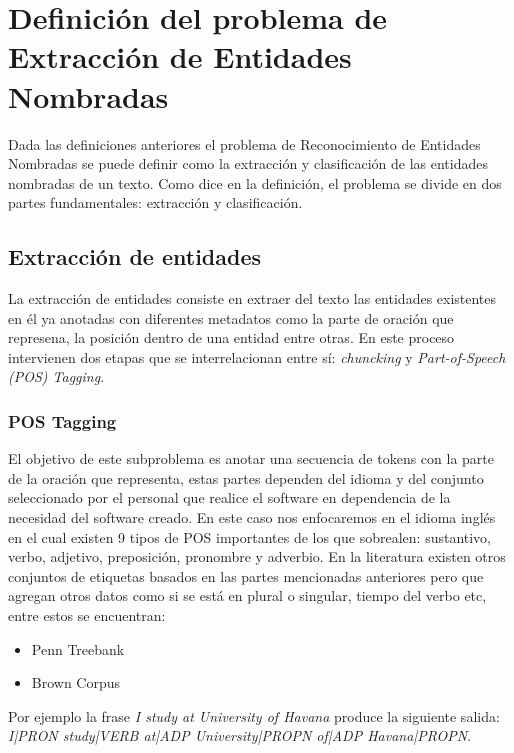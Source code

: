 \documentclass[runningheads]{llncs}
\begin{document}
\section{Definición del problema de Extracción de Entidades Nombradas}

Dada las definiciones anteriores el problema de Reconocimiento de Entidades Nombradas se puede definir como la extracción y clasificación de las entidades nombradas de un texto. Como dice en la definición, el problema se divide en dos partes fundamentales: extracción y clasificación.

\subsection{Extracción de entidades}

La extracción de entidades consiste en extraer del texto las entidades existentes en él ya anotadas con diferentes metadatos como la parte de oración que represena, la posición dentro de una entidad entre otras. En este proceso intervienen dos etapas que se interrelacionan entre sí: \emph{chuncking}\cite{chunking} y \emph{Part-of-Speech (POS) Tagging}\cite{postag}.

\subsubsection{POS Tagging}

El objetivo de este subproblema es anotar una secuencia de tokens con la parte de la oración que representa, estas partes dependen del idioma y del conjunto seleccionado por el personal que realice el software en dependencia de la necesidad del software creado. En este caso nos enfocaremos en el idioma inglés en el cual existen 9 tipos de POS importantes de los que sobrealen: sustantivo, verbo, adjetivo, preposición, pronombre y adverbio. En la literatura existen otros conjuntos de etiquetas basados en las partes mencionadas anteriores pero que agregan otros datos como si se está en plural o singular, tiempo del verbo etc, entre estos se encuentran:

\begin{itemize}
\item Penn Treebank \cite{pennpostag}
\item Brown Corpus \cite{brownpostag}
\end{itemize}

Por ejemplo la frase \emph{I study at University of Havana} produce la siguiente salida: \emph{I|PRON study|VERB at|ADP University|PROPN of|ADP Havana|PROPN}.
\end{document}
